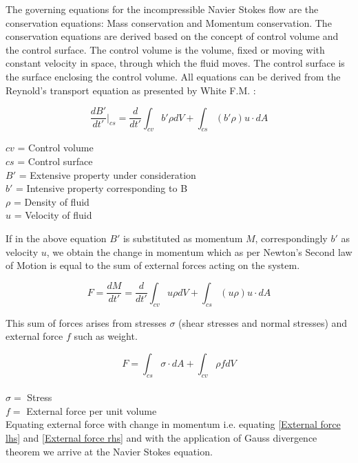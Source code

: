 \documentclass[a4paper,12pt]{book}
\begin{document}
The governing equations for the incompressible Navier Stokes flow are the conservation equations: Mass conservation and Momentum conservation. The conservation equations are derived based on the concept of control volume and the control surface. The control volume is the volume, fixed or moving with constant velocity in space, through which the fluid moves. The control surface is the surface enclosing the control volume. All equations can be derived from the Reynold's transport equation as presented by White F.M. \cite{white}:


\begin{equation} \label{rtt} 
\frac{dB'}{dt'}|_{cs} = \frac{d}{dt'} \int_{cv} b' \rho dV + \int_{cs} (b' \rho) u\cdot dA 
\end{equation}

\begin{center}
$cv$ = Control volume\\
$cs$ = Control surface\\
$B'$ = Extensive property under consideration  \\
$b'$ = Intensive property corresponding to B \\
$\rho$ = Density of fluid \\
$u$ = Velocity of fluid\\
\end{center}

If in the above equation $B'$ is substituted as momentum $M$, correspondingly $b'$ as velocity $u$, we obtain the change in momentum which as per Newton's Second law of Motion is equal to the sum of external forces acting on the system. 

\begin{equation}\label{External force lhs}
F = \frac{dM}{dt'} = \frac{d}{dt'} \int_{cv} u \rho dV + \int_{cs} (u \rho) u\cdot dA 
\end{equation}

This sum of forces arises from stresses $\sigma$ (shear stresses and normal stresses) and external force $f$ such as weight. 

\begin{equation}\label{External force rhs}
F = \int_{cs} \sigma \cdot dA + \int_{cv} \rho f dV
\end{equation}
\\
$\sigma =$ Stress\\
$f =$ External force per unit volume\\

Equating external force with change in momentum i.e. equating \eqref{External force lhs} and \eqref{External force rhs} and with the application of Gauss divergence theorem we arrive at the Navier Stokes equation.
\end{document}
